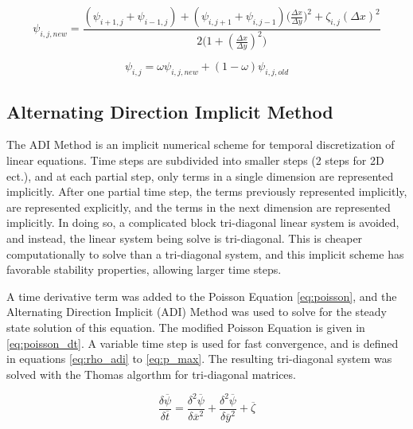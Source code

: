 \begin{equation}
\label{eq:poisson_sor1} 
\psi_{i,j,new} = \frac{(\psi_{i+1,j} + \psi_{i-1,j}) + (\psi_{i,j+1} + \psi_{i,j-1})\big( \frac{\Delta x}{\Delta y} \big) ^2 + \zeta_{i,j}  (\Delta x)^2}{2 \big( 1 + (\frac{\Delta x}{\Delta y})^2 \big)}
\end{equation}


\begin{equation}
\label{eq:poisson_sor2} 
\psi_{i,j} = \omega \psi_{i,j,new} + (1 - \omega) \psi_{i,j,old} 
\end{equation}



	\subsection{Alternating Direction Implicit Method}

The ADI Method is an implicit numerical scheme for temporal discretization of linear equations.  Time steps are subdivided into smaller steps (2 steps for 2D ect.), and at each partial step, only terms in a single dimension are represented implicitly.  After one partial time step, the terms previously represented implicitly, are represented explicitly, and the terms in the next dimension are represented implicitly.  In doing so, a complicated block tri-diagonal linear system is avoided, and instead, the linear system being solve is tri-diagonal.  This is cheaper computationally to solve than a tri-diagonal system, and this implicit scheme has favorable stability properties, allowing larger time steps.

A time derivative term was added to the Poisson Equation \ref{eq:poisson}, and the Alternating Direction Implicit (ADI) Method was used to solve for the steady state solution of this equation.  The modified Poisson Equation is given in \ref{eq:poisson_dt}.  A variable time step is used for fast convergence, and is defined in equations \ref{eq:rho_adi} to \ref{eq:p_max}.  The resulting tri-diagonal system was solved with the Thomas algorthm for tri-diagonal matrices.




\begin{equation}
\label{eq:poisson_dt} 
\frac{\delta \overline{\psi}}{\delta \overline{t}} =
\frac{\delta^2 \overline{\psi}}{\delta \overline{x}^2} + \frac{\delta^2 \overline{\psi}}{\delta \overline{y}^2} + \overline{\zeta}
\end{equation}

